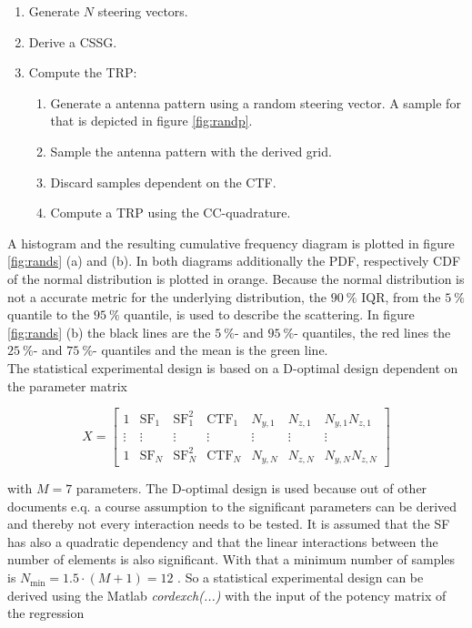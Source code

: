\begin{enumerate}
\item Generate $N$ steering vectors.
\item Derive a \ac{CSSG}.
\item Compute the \ac{TRP}:
\begin{enumerate}
\item Generate a antenna pattern using a random steering vector. A sample for that is depicted in figure \ref{fig:randp}.
\item Sample the antenna pattern with the derived grid.
\item Discard samples dependent on the \ac{CTF}.
\item Compute a \ac{TRP} using the \ac{CC}-quadrature.
\end{enumerate}
\end{enumerate}

A histogram and the resulting cumulative frequency diagram is plotted in figure \ref{fig:rands} (a) and (b). In both diagrams additionally the \ac{PDF}, respectively \ac{CDF} of the normal distribution is plotted in orange. Because the normal distribution is not a accurate metric for the underlying distribution, the $\SI{90}{\percent}$ \ac{IQR}, from the $\SI{5}{\percent}$ quantile to the $\SI{95}{\percent}$ quantile, is used to describe the scattering. In figure \ref{fig:rands} (b) the black lines are the $\SI{5}{\percent}$- and $\SI{95}{\percent}$- quantiles, the red lines the $\SI{25}{\percent}$- and $\SI{75}{\percent}$- quantiles and the mean is the green line.\\
The statistical experimental design is based on a D-optimal design dependent on the parameter matrix

\begin{equation}
X = \begin{bmatrix}
1 & \text{SF}_1 & \text{SF}_1^2 & \text{CTF}_1 & N_{y,1} & N_{z,1} & N_{y,1}N_{z,1}\\
\vdots & \vdots & \vdots & \vdots & \vdots & \vdots & \vdots\\
1 & \text{SF}_N & \text{SF}_N^2 & \text{CTF}_N & N_{y,N} & N_{z,N} & N_{y,N}N_{z,N}
\end{bmatrix}
\label{eq:parammatrix}
\end{equation}

with $M=7$ parameters. The D-optimal design is used because out of other documents e.q. \cite{2018arXiv180310993F} a course assumption to the significant parameters can be derived and thereby not every interaction needs to be tested. It is assumed that the \ac{SF} has also a quadratic dependency and that the linear interactions between the number of elements is also significant. With that a minimum number of samples is $N_\text{min}=1.5\cdot\left(M+1\right)=12$ \cite{dffs}. So a statistical experimental design can be derived using the Matlab\texttrademark{} \textit{cordexch(...)} with the input of the potency matrix of the regression

